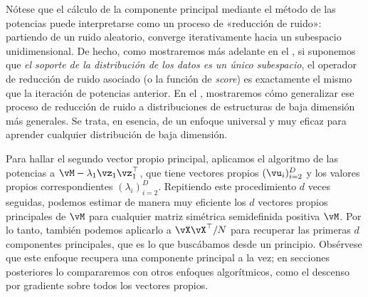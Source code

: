 \documentclass[../../book-main.tex]{subfiles}
\begin{document}
\begin{remark} Nótese que
    el cálculo de la componente principal mediante el método de las potencias puede
    interpretarse como un proceso de «reducción de ruido»: partiendo de un ruido aleatorio,
    converge iterativamente hacia un subespacio unidimensional.
    De hecho, como mostraremos más adelante en el , si
    suponemos que {\em el soporte de la distribución de los datos es un único
    subespacio}, el operador de reducción de ruido asociado (o la función de \textit{score})
    es exactamente el mismo que la iteración de potencias anterior. En
    el , mostraremos cómo generalizar ese
    proceso de reducción de ruido a distribuciones de estructuras
    de baja dimensión más generales. Se trata, en esencia, de un enfoque universal y
    muy eficaz para aprender cualquier distribución de baja dimensión.
\end{remark}

Para hallar el segundo vector propio principal, aplicamos el algoritmo de las potencias
a \(\vM - \lambda_{1}\vz_{1}\vz_{1}^{\top}\), que tiene
vectores propios \((\vu_{i})_{i = 2}^{D}\) y los valores propios correspondientes
\((\lambda_{i})_{i = 2}^{D}\). Repitiendo este procedimiento \(d\)
veces seguidas, podemos estimar de manera muy eficiente los \(d\)
vectores propios principales de \(\vM\) para cualquier matriz simétrica semidefinida positiva
\(\vM\). Por lo tanto, también podemos aplicarlo a \(\vX\vX^{\top}/N\) para
recuperar las primeras \(d\) componentes principales, que es lo que
buscábamos desde un principio. Obsérvese que este enfoque recupera una
componente principal a la vez; en secciones posteriores lo compararemos con otros
enfoques algorítmicos, como el descenso por gradiente sobre todos los vectores propios.

%
\end{document}
